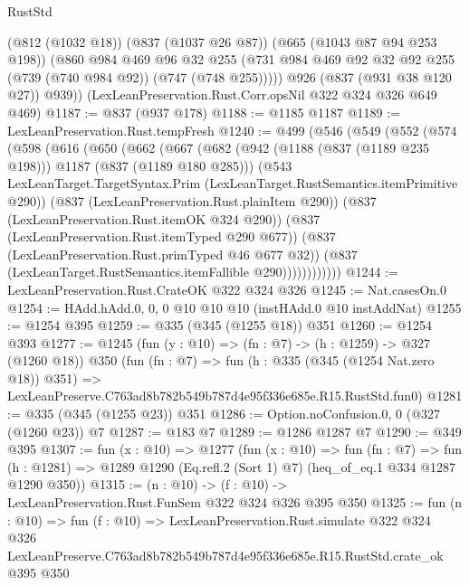\begin{lexlean}{RustStd}
\begin{coremodule}
          (@812 (@1032 @18))
          (@837 (@1037 @26 @87))
          (@665 (@1043 @87 @94 @253 @198))
          (@860
            @984
            @469
            @96
            @32
            @255
            (@731 @984 @469 @92 @32 @92 @255 (@739 (@740 @984 @92)) (@747 (@748 @255)))))
        @926
        (@837 (@931 @38 @120 @27))
        @939))
    (LexLeanPreservation.Rust.Corr.opsNil @322 @324 @326 @649 @469)
@1187 := @837 (@937 @178)
@1188 := @1185 @1187
@1189 := LexLeanPreservation.Rust.tempFresh
@1240 := @499
    (@546
      (@549
        (@552
          (@574
            (@598
              (@616
                (@650
                  (@662
                    (@667
                      (@682
                        (@942 (@1188 (@837 (@1189 @235 @198))) @1187 (@837 (@1189 @180 @285)))
                        (@543
                          LexLeanTarget.TargetSyntax.Prim
                          (LexLeanTarget.RustSemantics.itemPrimitive @290))
                        (@837 (LexLeanPreservation.Rust.plainItem @290))
                        (@837 (LexLeanPreservation.Rust.itemOK @324 @290))
                        (@837 (LexLeanPreservation.Rust.itemTyped @290 @677))
                        (@837 (LexLeanPreservation.Rust.primTyped @46 @677 @32))
                        (@837 (LexLeanTarget.RustSemantics.itemFallible @290))))))))))))
@1244 := LexLeanPreservation.Rust.CrateOK @322 @324 @326
@1245 := Nat.casesOn.{0}
@1254 := HAdd.hAdd.{0, 0, 0} @10 @10 @10 (instHAdd.{0} @10 instAddNat)
@1255 := @1254 @395
@1259 := @335 (@345 (@1255 @18)) @351
@1260 := @1254 @393
@1277 := @1245
    (fun (y : @10) => (fn : @7) -> (h : @1259) -> @327 (@1260 @18))
    @350
    (fun (fn : @7) =>
    fun (h : @335 (@345 (@1254 Nat.zero @18)) @351) =>
    LexLeanPreserve.C763ad8b782b549b787d4e95f336e685e.R15.RustStd.fun0)
@1281 := @335 (@345 (@1255 @23)) @351
@1286 := Option.noConfusion.{0, 0} (@327 (@1260 @23)) @7
@1287 := @183 @7
@1289 := @1286 @1287 @7
@1290 := @349 @395
@1307 := fun (x : @10) =>
  @1277
    (fun (x : @10) =>
    fun (fn : @7) =>
    fun (h : @1281) => @1289 @1290 (Eq.refl.{2} (Sort 1) @7) (heq_of_eq.{1} @334 @1287 @1290 @350))
@1315 := (n : @10) -> (f : @10) -> LexLeanPreservation.Rust.FunSem @322 @324 @326 @395 @350
@1325 := fun (n : @10) =>
  fun (f : @10) =>
  LexLeanPreservation.Rust.simulate
    @322
    @324
    @326
    LexLeanPreserve.C763ad8b782b549b787d4e95f336e685e.R15.RustStd.crate_ok
    @395
    @350
\end{coremodule}
\end{lexlean}
